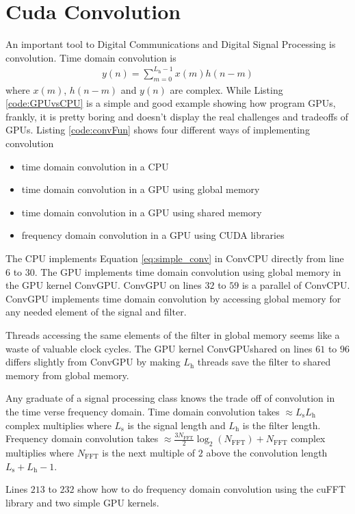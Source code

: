 \section{Cuda Convolution}
An important tool to Digital Communications and Digital Signal Processing is convolution.
Time domain convolution is
\begin{align}
y(n) = \sum^{L_\text{h}-1}_{m=0} x(m) h(n-m)
	 \label{eq:simple_conv}
\end{align}
where $x(m)$, $h(n-m)$ and $y(n)$ are complex. 
While Listing \ref{code:GPUvsCPU} is a simple and good example showing how program GPUs, frankly, it is pretty boring and doesn't display the real challenges and tradeoffs of GPUs.
Listing \ref{code:convFun} shows four different ways of implementing convolution
\begin{itemize}
  \item time domain convolution in a CPU
  \item time domain convolution in a GPU using global memory
  \item time domain convolution in a GPU using shared memory
  \item frequency domain convolution in a GPU using CUDA libraries
\end{itemize}
The CPU implements Equation \eqref{eq:simple_conv} in ConvCPU directly from line $6$ to $30$.
The GPU implements time domain convolution using global memory in the GPU kernel ConvGPU.
ConvGPU on lines $32$ to $59$ is a parallel of ConvCPU.
ConvGPU implements time domain convolution by accessing global memory for any needed element of the signal and filter.

Threads accessing the same elements of the filter in global memory seems like a waste of valuable clock cycles.
The GPU kernel ConvGPUshared on lines $61$ to $96$ differs slightly from ConvGPU by making $L_\text{h}$ threads save the filter to shared memory from global memory.

Any graduate of a signal processing class knows the trade off of convolution in the time verse frequency domain.
Time domain convolution takes $\approx L_\text{s} L_\text{h}$ complex multiplies where $L_\text{s}$ is the signal length and $L_\text{h}$ is the filter length.
Frequency domain convolution takes $\approx \frac{3 N_\text{FFT}}{2} \log_2(N_\text{FFT}) + N_\text{FFT}$ complex multiplies where $N_\text{FFT}$ is the next multiple of $2$ above the convolution length $L_\text{s}+L_\text{h}-1$.

Lines $213$ to $232$ show how to do frequency domain convolution using the cuFFT library and two simple GPU kernels.


